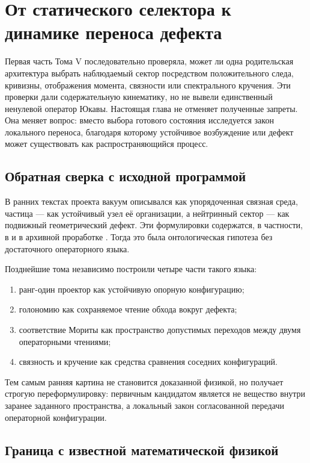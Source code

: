 \chapter{От статического селектора к динамике переноса дефекта}

Первая часть Тома V последовательно проверяла, может ли одна родительская
архитектура выбрать наблюдаемый сектор посредством положительного следа,
кривизны, отображения момента, связности или спектрального кручения. Эти
проверки дали содержательную кинематику, но не вывели единственный
ненулевой оператор Юкавы. Настоящая глава не отменяет полученные запреты.
Она меняет вопрос: вместо выбора готового состояния исследуется закон
локального переноса, благодаря которому устойчивое возбуждение или дефект
может существовать как распространяющийся процесс.

\section{Обратная сверка с исходной программой}

В ранних текстах проекта вакуум описывался как упорядоченная связная среда,
частица --- как устойчивый узел её организации, а нейтринный сектор --- как
подвижный геометрический дефект. Эти формулировки содержатся, в частности,
в  и в архивной проработке
.
Тогда это была онтологическая гипотеза без достаточного операторного языка.

Позднейшие тома независимо построили четыре части такого языка:
\begin{enumerate}
 \item ранг-один проектор как устойчивую опорную конфигурацию;
 \item голономию как сохраняемое чтение обхода вокруг дефекта;
 \item соответствие Мориты как пространство допустимых переходов между
 двумя операторными чтениями;
 \item связность и кручение как средства сравнения соседних конфигураций.
\end{enumerate}
Тем самым ранняя картина не становится доказанной физикой, но получает
строгую переформулировку: первичным кандидатом является не вещество внутри
заранее заданного пространства, а локальный закон согласованной передачи
операторной конфигурации.

\section{Граница с известной математической физикой}


